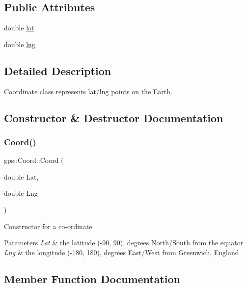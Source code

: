 \subsection*{Public Attributes}
\begin{DoxyCompactItemize}
\item 
double \hyperlink{classgps_1_1Coord_a17cbbd7580a83c42f650b8f93e14d98e}{lat}
\item 
double \hyperlink{classgps_1_1Coord_abca98aaabe2dc3cf50ebdd687c2f47e8}{lng}
\end{DoxyCompactItemize}


\subsection{Detailed Description}
Coordinate class represents lat/lng points on the Earth. 

\subsection{Constructor \& Destructor Documentation}
\mbox{\label{classgps_1_1Coord_afcc45fae837b48cd7d9bd545c4dc574c}} 
\subsubsection{\texorpdfstring{Coord()}{Coord()}}
{\footnotesize\ttfamily gps\+::\+Coord\+::\+Coord (\begin{DoxyParamCaption}\item[{double}]{Lat,  }\item[{double}]{Lng }\end{DoxyParamCaption})}

Constructor for a co-\/ordinate 
\begin{DoxyParams}{Parameters}
{\em Lat} & the latitude (-\/90, 90), degrees North/\+South from the equator \\
\hline
{\em Lng} & the longitude (-\/180, 180), degrees East/\+West from Greenwich, England \\
\hline
\end{DoxyParams}


\subsection{Member Function Documentation}
\mbox{\label{classgps_1_1Coord_a69ead8580e270f1319d9bbf3da680d45}} 
